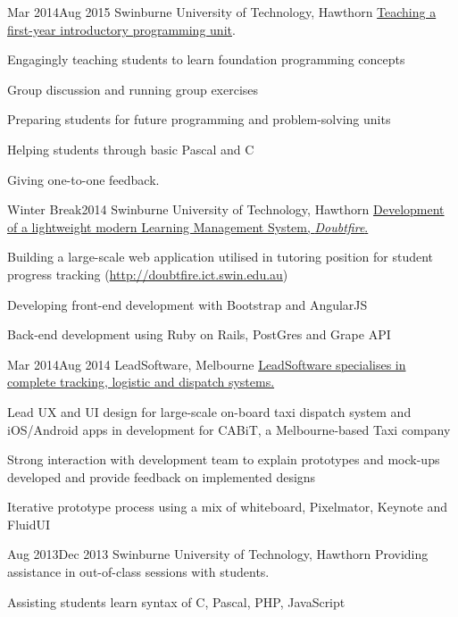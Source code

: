 {{        }
        {Mar 2014}{Aug 2015}
        {Swinburne University of Technology, Hawthorn}
        {\href{http://www.swinburne.edu.au/study/courses/units/Introduction-to-Programming-COS10009/local}{Teaching a first-year introductory programming unit}.}
        {
          \item Engagingly teaching students to learn foundation programming concepts
          \item Group discussion and running group exercises
          \item Preparing students for future programming and problem-solving units
          \item Helping students through basic Pascal and C
          \item Giving one-to-one feedback.
        }
        {Winter Break}{2014}
        {Swinburne University of Technology, Hawthorn}
        {\href{http://alexcu.me/#modal-doubtfire}{Development of a lightweight modern Learning Management System, \emph{Doubtfire}.}}
        {
            \item Building a large-scale web application utilised in tutoring position for student progress tracking (\href{http://doubtfire.ict.swin.edu.au}{http://doubtfire.ict.swin.edu.au})
            \item Developing front-end development with Bootstrap and AngularJS
            \item Back-end development using Ruby on Rails, PostGres and Grape API
        }
        {Mar 2014}{Aug 2014}
        {LeadSoftware, Melbourne}
        {\href{http://www.leadsoftware.com.au/}{LeadSoftware specialises in complete tracking, logistic and dispatch systems.}}
        {
          \item Lead UX and UI design for large-scale on-board taxi dispatch system and iOS/Android apps in development for CABiT, a Melbourne-based Taxi company
          \item Strong interaction with development team to explain prototypes and mock-ups developed and provide feedback on implemented designs
          \item Iterative prototype process using a mix of whiteboard, Pixelmator, Keynote and FluidUI
        }
        {Aug 2013}{Dec 2013}
        {Swinburne University of Technology, Hawthorn}
        {Providing assistance in out-of-class sessions with students.}
        {
            \item Assisting students learn syntax of C, Pascal, PHP, JavaScript
}}
